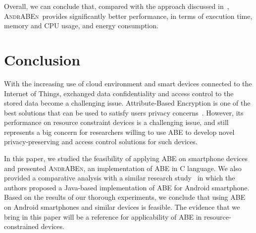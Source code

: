 \documentclass{sig-alternate-2013}
\newcommand{\andraben}{\textsc{AndrABEn}}
\begin{document}
Overall, we can conclude that, compared with the approach discussed in~\cite{ABE_icc_2014}, \andraben~provides significantly better performance, in terms of execution time, memory and CPU usage, and energy consumption.

\section{Conclusion}\label{sec:conclusion} 
With the increasing use of cloud environment and smart devices connected to the Internet of Things, exchanged data confidentiality and access control to the stored data become a challenging issue. Attribute-Based Encryption is one of the best solutions that can be used to satisfy users privacy concerns~\cite{ABE_icc_2014}. However, its performance on resource constraint devices is a challenging issue, and still represents a big concern for researchers willing to use ABE to develop novel privacy-preserving and access control solutions for such devices.

In this paper, we studied the feasibility of applying ABE on smartphone devices and presented \andraben, an implementation of ABE in C language.
We also provided a comparative analysis with a similar research study~\cite{ABE_icc_2014} in which the authors proposed a Java-based implementation of ABE for Android smartphone.
Based on the results of our thorough experiments, we conclude that using ABE on Android smartphones and similar devices is feasible. 
The evidence that we bring in this paper will be a reference for applicability of ABE in resource-constrained devices.

\balance


\end{document}
